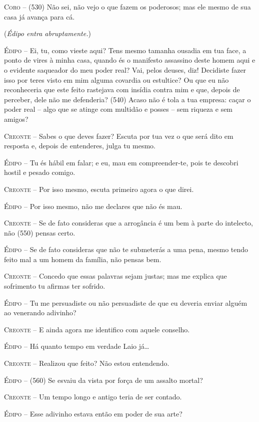 \textsc{Coro} --   (530) Não sei, não vejo o que fazem os poderosos; mas ele mesmo de sua
casa já avança para cá.

(\emph{Édipo entra abruptamente.})

\textsc{Édipo} --   Ei, tu, como vieste aqui? Tens mesmo tamanha ousadia em tua face, a
ponto de vires à minha casa, quando és o manifesto assassino deste homem
aqui e o evidente saqueador do meu poder real? Vai, pelos deuses, diz!
Decidiste fazer isso por teres visto em mim alguma covardia ou
estultice? Ou que eu não reconheceria que este feito rastejava com
insídia contra mim e que, depois de perceber, dele não me defenderia?
(540) Acaso não é tola a tua empresa: caçar o poder real -- algo que se
atinge com multidão e posses -- sem riqueza e sem amigos?

\textsc{Creonte} --   Sabes o que deves fazer? Escuta por tua vez o que será dito em resposta
e, depois de entenderes, julga tu mesmo.

\textsc{Édipo} --   Tu és hábil em falar; e eu, mau em compreender-te, pois te descobri
hostil e pesado comigo.

\textsc{Creonte} --   Por isso mesmo, escuta primeiro agora o que direi.

\textsc{Édipo} --   Por isso mesmo, não me declares que não és mau.

\textsc{Creonte} --   Se de fato consideras que a arrogância é um bem à parte do intelecto,
não (550) pensas certo.

\textsc{Édipo} --   Se de fato consideras que não te submeterás a uma pena, mesmo tendo
feito mal a um homem da família, não pensas bem.

\textsc{Creonte} --   Concedo que essas palavras sejam justas; mas me explica que sofrimento
tu afirmas ter sofrido.

\textsc{Édipo} --   Tu me persuadiste ou não persuadiste de que eu deveria enviar alguém ao
venerando adivinho?

\textsc{Creonte} --   E ainda agora me identifico com aquele conselho.

\textsc{Édipo}  -- Há quanto tempo em verdade Laio já\ldots{}  

\textsc{Creonte} --   Realizou que feito? Não estou entendendo.

\textsc{Édipo} --   (560) Se esvaiu da vista por força de um assalto mortal?

\textsc{Creonte} --   Um tempo longo e antigo teria de ser contado.

\textsc{Édipo} --   Esse adivinho estava então em poder de sua arte?


